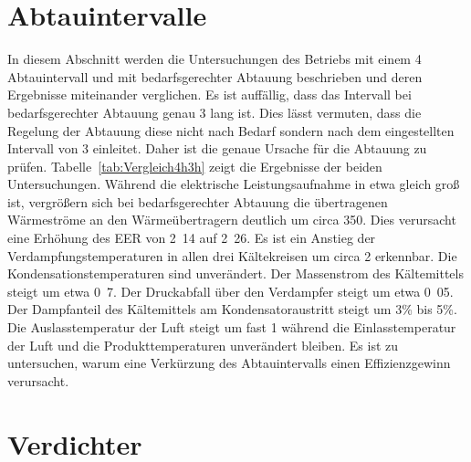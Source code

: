 \section{Abtauintervalle}
\label{sec:Abtauintervalle}

In diesem Abschnitt werden die Untersuchungen des Betriebs mit einem \unit{4}{\hour} Abtauintervall und mit bedarfsgerechter Abtauung beschrieben und deren Ergebnisse miteinander verglichen. 
Es ist auffällig, dass das Intervall bei bedarfsgerechter Abtauung genau \unit{3}{\hour} lang ist. Dies lässt vermuten, dass die Regelung der Abtauung diese nicht nach Bedarf sondern nach dem eingestellten Intervall von \unit{3}{\hour} einleitet. Daher ist die genaue Ursache für die Abtauung zu prüfen. \newline
Tabelle~\ref{tab:Vergleich4h3h} zeigt die Ergebnisse der beiden Untersuchungen.
Während die elektrische Leistungsaufnahme in etwa gleich groß ist, vergrößern sich bei bedarfsgerechter Abtauung die übertragenen Wärmeströme an den Wärmeübertragern deutlich um circa \unit{350}{\watt}. Dies verursacht eine Erhöhung des EER von \unit{2.14}{} auf \unit{2.26}{}.
Es ist ein Anstieg der Verdampfungstemperaturen in allen drei Kältekreisen um circa \unit{2}{\kelvin} erkennbar. Die Kondensationstemperaturen sind unverändert. Der Massenstrom des Kältemittels steigt um etwa \unit{0.7}{\gram\per\second}. Der Druckabfall über den Verdampfer steigt um etwa \unit{0.05}{\bbar}. Der Dampfanteil des Kältemittels am Kondensatoraustritt steigt um \unit{3}{\%} bis \unit{5}{\%}. Die Auslasstemperatur der Luft steigt um fast \unit{1}{\kelvin} während die Einlasstemperatur der Luft und die Produkttemperaturen unverändert bleiben. \newline
Es ist zu untersuchen, warum eine Verkürzung des Abtauintervalls einen Effizienzgewinn verursacht.

 











\clearpage



\section{Verdichter}
\label{sec:Verdichter}


